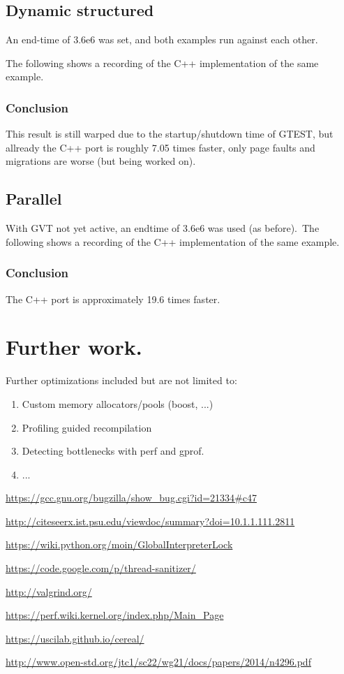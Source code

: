 \documentclass[8pt,a4paper]{report}
\begin{document}
\subsection{Dynamic structured}
An end-time of 3.6e6 was set, and both examples run against each other.

The following shows a recording of the C++ implementation of the same example.\\

\subsubsection{Conclusion}
This result is still warped due to the startup/shutdown time of GTEST, but allready the C++ port is roughly 7.05 times faster, only page faults and migrations are worse (but being worked on).
\subsection{Parallel}
With GVT not yet active, an endtime of 3.6e6 was used (as before).\
The following shows a recording of the C++ implementation of the same example.\\

\subsubsection{Conclusion}
The C++ port is approximately 19.6 times faster.

\section{Further work.}
Further optimizations included but are not limited to: 
\begin{enumerate}
\item Custom memory allocators/pools (boost, ...)
\item Profiling guided recompilation
\item Detecting bottlenecks with perf and gprof.
\item ...
\end{enumerate}

\begin{thebibliography}{1}


   \url{https://gcc.gnu.org/bugzilla/show_bug.cgi?id=21334#c47}

   \url{http://citeseerx.ist.psu.edu/viewdoc/summary?doi=10.1.1.111.2811}
  
   \url{https://wiki.python.org/moin/GlobalInterpreterLock}
  
   \url{https://code.google.com/p/thread-sanitizer/}
  
   \url{http://valgrind.org/}
  
   \url{https://perf.wiki.kernel.org/index.php/Main_Page}
  
   \url{https://uscilab.github.io/cereal/}
  
   \url{http://www.open-std.org/jtc1/sc22/wg21/docs/papers/2014/n4296.pdf}

  \end{thebibliography}
\end{document}
